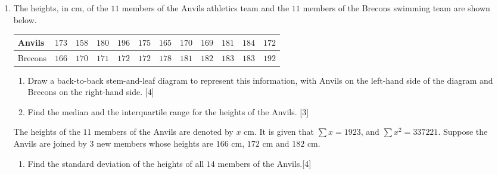 \begin{enumerate}

\item 



 The heights, in \si{\cm}, of the $11$ members of the Anvils athletics team and the $11$ members of the Brecons swimming team are shown below.
 
 	 \medskip
 
 \renewcommand{\arraystretch}{1.2} %
 \begin{tabular}{|l|c|c|c|c|c|c|c|c|c|c|c|}
 	\hline
 	Anvils  & $ 173 $ & $ 158 $ & $ 180 $ & $ 196$ & $175 $  & $165$ & $170$ & $169$& $181$& $184$ & $172$ \\ 
 	\hline
 	Brecons & $ 166 $ & $ 170 $ & $ 171 $ & $ 172$ & $172 $  & $178$ & $181$ & $182$& $183$& $183$ & $192$ \\ 
 	\hline
 \end{tabular}
 
 \medskip
 
 \begin{enumerate}[label=(\roman*)]
 	\item Draw a back-to-back stem-and-leaf diagram to represent this information, with Anvils on the
 	left-hand side of the diagram and Brecons on the right-hand side. \hfill [4]
 	
 	\item Find the median and the interquartile range for the heights of the Anvils. \hfill [3]
 \end{enumerate}

The heights of the $11$ members of the Anvils are denoted by $x$ \si{\cm}. It is given that $ \sum x =1923$, and  $\sum x^2 =337 221$. Suppose the Anvils are joined by $3$ new members whose heights are $166$ \si{\cm}, $172$ \si{\cm} and $182$ \si{\cm}.

\begin{enumerate}[resume,label=(\roman*)]
	\item Find the standard deviation of the heights of all $14$ members of the Anvils.\hfill  [4]
\end{enumerate}




\end{enumerate}
